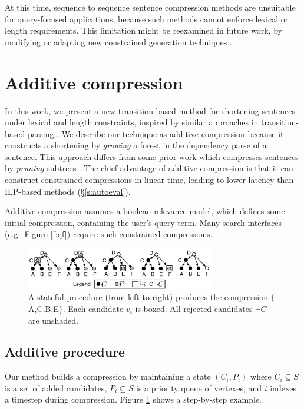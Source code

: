 \documentclass[11pt,a4paper]{article}
\begin{document}
At this time, sequence to sequence sentence compression methods \cite{filippova2015sentence} are unsuitable for query-focused applications, because such methods cannot enforce lexical or length requirements. This limitation might be reexamined in future work, by modifying or adapting new constrained generation techniques \cite{N18-1119,aaimh}.

\section{Additive compression}\label{s:system}

In this work, we present a new transition-based method for shortening sentences under lexical and length constraints, inspired by similar approaches in transition-based parsing \cite{nivre2003}. We describe our technique as additive compression because it constructs a shortening by \textit{growing} a forest in the dependency parse of a sentence. This approach differs from some prior work which
compresses sentences by \textit{pruning} subtrees \cite{Knight2000StatisticsBasedS,berg2011jointly,almeida2013fast,Filippova2015FastKS}. The chief advantage of additive compression is that it can construct constrained compressions in linear time, leading to lower latency than ILP-based methods (\S\ref{s:autoeval}). 

Additive compression assumes a boolean relevance model, which defines some initial compression, containing the user's query term. Many search interfaces (e.g.\ Figure \ref{f:qf}) require such constrained compressions.


\begin{figure}[h]
\includegraphics[width=8.2cm]{additive.pdf}
\caption{A stateful procedure (from left to right) produces the compression $\{$A,C,B,E$\}$. Each candidate $v_i$ is boxed. All rejected candidates $\neg C$ are unshaded.}
\label{f:walkthru}
\end{figure}

\subsection{Additive procedure}\label{s:formal}

Our method builds a compression by maintaining a state
$(C_i,P_i)$ where $C_i \subseteq S$ is a set of added candidates, $P_i  \subseteq S$ is a priority queue of vertexes, and $i$ indexes a timestep during compression. Figure \ref{f:walkthru} shows a step-by-step example. 
\end{document}

